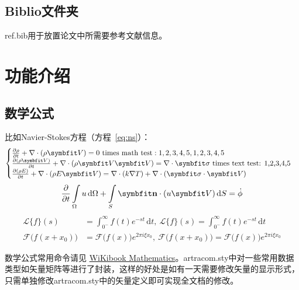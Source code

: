 \subsection{Biblio文件夹}

 ref.bib用于放置论文中所需要参考文献信息。

\section{功能介绍}

\subsection{数学公式}

比如Navier-Stokes方程（方程~\eqref{eq:ns}）：
\begin{equation} \label{eq:ns}
    \begin{cases}
        \frac{\partial \rho}{\partial t} + \nabla\cdot(\rho\Vector{V}) = 0 \ \mathrm{times\ math\ test: 1,2,3,4,5}, 1,2,3,4,5\\
        \frac{\partial (\rho\Vector{V})}{\partial t} + \nabla\cdot(\rho\Vector{V}\Vector{V}) = \nabla\cdot\Tensor{\sigma} \ \text{times text test: 1,2,3,4,5}\\
        \frac{\partial (\rho E)}{\partial t} + \nabla\cdot(\rho E\Vector{V}) = \nabla\cdot(k\nabla T) + \nabla\cdot(\Tensor{\sigma}\cdot\Vector{V})
    \end{cases}
\end{equation}
\begin{equation}
    \frac{\partial }{\partial t}\int\limits_{\Omega} u \, \mathrm{d}\Omega + \int\limits_{S} \unitVector{n}\cdot(u\Vector{V}) \, \mathrm{d}S = \dot{\phi}
\end{equation}
\[
    \begin{split}
        \mathcal{L} \{f\}(s) &= \int _{0^{-}}^{\infty} f(t) e^{-st} \, \mathrm{d}t, \ 
        \mathscr{L} \{f\}(s) = \int _{0^{-}}^{\infty} f(t) e^{-st} \, \mathrm{d}t\\
        \mathcal{F} {\bigl (} f(x+x_{0}) {\bigr )} &= \mathcal{F} {\bigl (} f(x) {\bigr )} e^{2\pi i\xi x_{0}}, \ 
        \mathscr{F} {\bigl (} f(x+x_{0}) {\bigr )} = \mathscr{F} {\bigl (} f(x) {\bigr )} e^{2\pi i\xi x_{0}}
    \end{split}
\]

数学公式常用命令请见 \href{https://en.wikibooks.org/wiki/LaTeX/Mathematics}{WiKibook Mathematics}。artracom.sty中对一些常用数据类型如矢量矩阵等进行了封装，这样的好处是如有一天需要修改矢量的显示形式，只需单独修改artracom.sty中的矢量定义即可实现全文档的修改。

